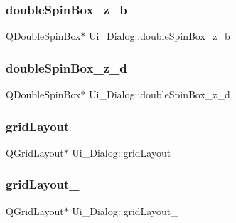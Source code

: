 \hypertarget{class_ui___dialog_a20dc0d9e1d1c6829f8c1969bc1bfc6c8}{}\label{class_ui___dialog_a20dc0d9e1d1c6829f8c1969bc1bfc6c8} 
\subsubsection{\texorpdfstring{double\+Spin\+Box\+\_\+z\+\_\+b}{doubleSpinBox\_z\_b}}
{\footnotesize\ttfamily Q\+Double\+Spin\+Box$\ast$ Ui\+\_\+\+Dialog\+::double\+Spin\+Box\+\_\+z\+\_\+b}

\hypertarget{class_ui___dialog_af56082e875190dce33551c7b80637f67}{}\label{class_ui___dialog_af56082e875190dce33551c7b80637f67} 
\subsubsection{\texorpdfstring{double\+Spin\+Box\+\_\+z\+\_\+d}{doubleSpinBox\_z\_d}}
{\footnotesize\ttfamily Q\+Double\+Spin\+Box$\ast$ Ui\+\_\+\+Dialog\+::double\+Spin\+Box\+\_\+z\+\_\+d}

\hypertarget{class_ui___dialog_a41336d41594e8776a81d095e8e4ffc61}{}\label{class_ui___dialog_a41336d41594e8776a81d095e8e4ffc61} 
\subsubsection{\texorpdfstring{grid\+Layout}{gridLayout}}
{\footnotesize\ttfamily Q\+Grid\+Layout$\ast$ Ui\+\_\+\+Dialog\+::grid\+Layout}

\hypertarget{class_ui___dialog_af3de0f6556fd8c9d0aac09a2f90d92b9}{}\label{class_ui___dialog_af3de0f6556fd8c9d0aac09a2f90d92b9} 
\subsubsection{\texorpdfstring{grid\+Layout\+\_}{gridLayout\_2}}
{\footnotesize\ttfamily Q\+Grid\+Layout$\ast$ Ui\+\_\+\+Dialog\+::grid\+Layout\+\_}

